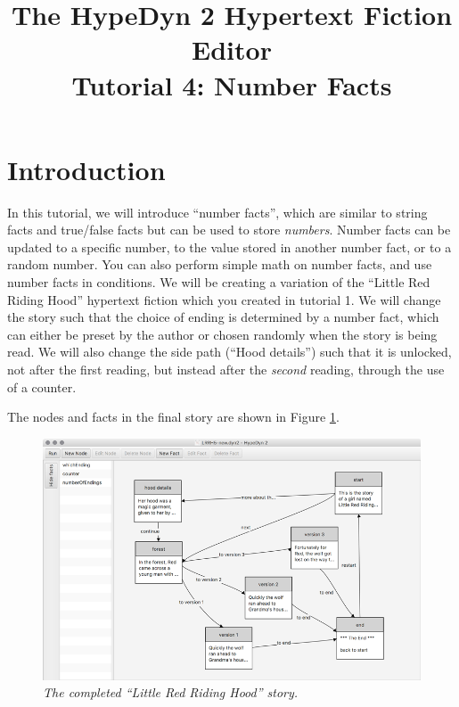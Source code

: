 \documentclass{article}
\begin{document}
\title{The HypeDyn 2 Hypertext Fiction Editor\\Tutorial 4: Number Facts}
\date{}

\onecolumn
\maketitle

\tableofcontents

\section{Introduction}
In this tutorial, we will introduce ``number facts'', which are similar to string facts and true\slash false facts but can be used to store \textit{numbers}. Number facts can be updated to a specific number, to the value stored in another number fact, or to a random number. You can also perform simple math on number facts, and use number facts in conditions. We will be creating a variation of the ``Little Red Riding Hood'' hypertext fiction which you created in tutorial 1. We will change the story such that the choice of ending is determined by a number fact, which can either be preset by the author or chosen randomly when the story is being read. We will also change the side path (``Hood details'')
such that it is unlocked, not after the first reading, but instead after the \textit{second} reading, through the use of a counter.


The nodes and facts in the final story are shown in Figure
\ref{fig:tut3:completed}.

\begin{figure}[h]
  \centering
  \includegraphics[width=12cm]{images/hypedyn-tutorial-4-figure-1}
  \caption{\textit{The completed ``Little Red Riding Hood'' story.}}
  \label{fig:tut3:completed}
\end{figure} 
\end{document}
